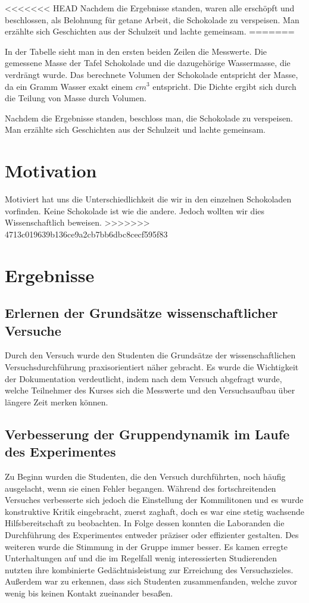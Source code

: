 \documentclass[12pt]{scrartcl}
\begin{document}
<<<<<<< HEAD
Nachdem die Ergebnisse standen, waren alle erschöpft und beschlossen, als Belohnung für getane Arbeit, die Schokolade zu verspeisen. Man erzählte sich Geschichten aus der Schulzeit und lachte gemeinsam.
=======

In der Tabelle sieht man in den ersten beiden Zeilen die Messwerte. Die gemessene Masse der Tafel Schokolade und die dazugehörige Wassermasse, die verdrängt wurde. Das berechnete Volumen der Schokolade entspricht der Masse, da ein Gramm Wasser exakt einem $cm^3$ entspricht. Die Dichte ergibt sich durch die Teilung von Masse durch Volumen. 

Nachdem die Ergebnisse standen, beschloss man, die Schokolade zu verspeisen. Man erzählte sich Geschichten aus der Schulzeit und lachte gemeinsam.
\section{Motivation}
Motiviert hat uns die Unterschiedlichkeit die wir in den einzelnen Schokoladen vorfinden. Keine Schokolade ist wie die andere. Jedoch wollten wir dies Wissenschaftlich beweisen.
>>>>>>> 4713c019639b136ce9a2cb7bb6dbc8cecf595f83

\section{Ergebnisse}
\subsection{Erlernen der Grundsätze wissenschaftlicher Versuche}
Durch den Versuch wurde den Studenten die Grundsätze der wissenschaftlichen Versuchsdurchführung praxisorientiert näher gebracht. Es wurde die Wichtigkeit der Dokumentation verdeutlicht, indem nach dem Versuch abgefragt wurde, welche Teilnehmer des Kurses sich die Messwerte und den Versuchsaufbau über längere Zeit merken können.
\subsection{Verbesserung der Gruppendynamik im Laufe des Experimentes}
Zu Beginn wurden die Studenten, die den Versuch durchführten, noch häufig ausgelacht, wenn sie einen Fehler begangen. Während des fortschreitenden Versuches verbesserte sich jedoch die Einstellung der Kommilitonen und es wurde konstruktive Kritik eingebracht, zuerst zaghaft, doch es war eine stetig wachsende Hilfsbereitschaft zu beobachten. In Folge dessen konnten die Laboranden die Durchführung des Experimentes entweder präziser oder effizienter gestalten. Des weiteren wurde die Stimmung in der Gruppe immer besser. Es kamen erregte Unterhaltungen auf und die im Regelfall wenig interessierten Studierenden nutzten ihre kombinierte Gedächtnisleistung zur Erreichung des Versuchszieles. Außerdem war zu erkennen, dass sich Studenten zusammenfanden, welche zuvor wenig bis keinen Kontakt zueinander besaßen.
\end{document}
